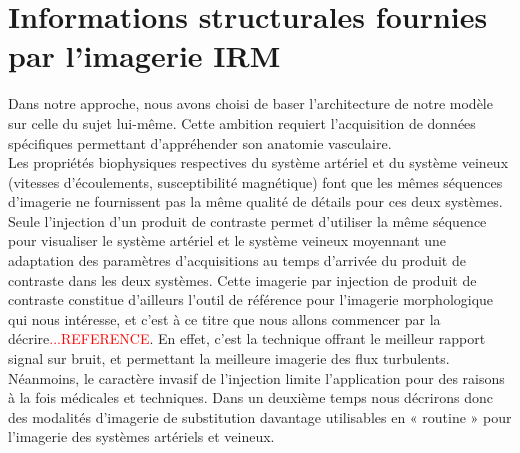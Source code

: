 \section{Informations structurales fournies par l'imagerie IRM}
Dans notre approche, nous avons choisi de baser l’architecture de notre modèle sur celle du sujet lui-même. Cette ambition requiert l’acquisition de données spécifiques permettant d’appréhender son anatomie vasculaire.\\
Les propriétés biophysiques respectives du système artériel et du système veineux (vitesses d’écoulements, susceptibilité magnétique) font que les mêmes séquences d’imagerie ne fournissent pas la même qualité de détails pour ces deux systèmes. Seule l’injection d’un produit de contraste permet d’utiliser la même séquence pour visualiser le système artériel et le système veineux moyennant une adaptation des paramètres d’acquisitions au temps d’arrivée du produit de contraste dans les deux systèmes. Cette imagerie par injection de produit de contraste constitue d’ailleurs l’outil de référence pour l’imagerie morphologique qui nous intéresse, et c’est à ce titre que nous allons commencer par la décrire\textcolor{red}{...REFERENCE}. En effet, c’est la technique offrant le meilleur rapport signal sur bruit, et permettant la meilleure imagerie des flux turbulents. Néanmoins, le caractère invasif de l’injection limite l’application pour des raisons à la fois médicales et techniques. Dans un deuxième temps nous décrirons donc des modalités d’imagerie de substitution davantage utilisables en « routine » pour l’imagerie des systèmes artériels et veineux.
